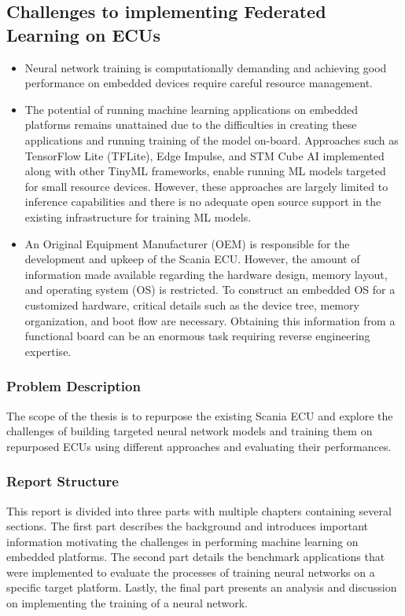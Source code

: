 \subsection*{Challenges to implementing Federated Learning on ECUs}

\begin{itemize}
	\item Neural network training is computationally demanding and achieving good performance on embedded devices require careful resource management.
	\item The potential of running machine learning applications on embedded platforms remains unattained due to the difficulties in creating these applications and running training of the model on-board. Approaches such as TensorFlow Lite (TFLite), Edge Impulse, and STM Cube AI implemented along with other TinyML frameworks, enable running ML models targeted for small resource devices. However, these approaches are largely limited to inference capabilities and there is no adequate open source support in the existing infrastructure for training ML models.
	\item An Original Equipment Manufacturer (OEM) is responsible for the development and upkeep of the Scania ECU. However, the amount of information made available regarding the hardware design, memory layout, and operating system (OS) is restricted. To construct an embedded OS for a customized hardware, critical details such as the device tree, memory organization, and boot flow are necessary. Obtaining this information from a functional board can be an enormous task requiring reverse engineering expertise.
\end{itemize}

\subsubsection{Problem Description}

The scope of the thesis is to repurpose the existing Scania ECU and explore the challenges of building targeted neural network models and training them on repurposed ECUs using different approaches and evaluating their performances.

\subsubsection{Report Structure}

This report is divided into three parts with multiple chapters containing several sections. The first part describes the background and introduces important information motivating the challenges in performing machine learning on embedded platforms. The second part details the benchmark applications that were implemented to evaluate the processes of training neural networks on a specific target platform. Lastly, the final part presents an analysis and discussion on implementing the training of a neural network.

